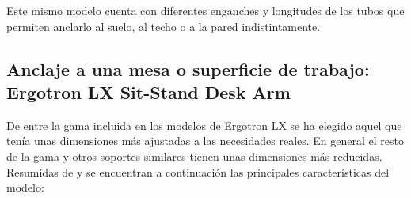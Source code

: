  Este mismo modelo cuenta con diferentes enganches y longitudes de los tubos que permiten anclarlo al suelo, al techo o a la pared indistintamente.
 \\


\subsection{Anclaje a una mesa o superficie de trabajo: Ergotron LX Sit-Stand Desk Arm}

 De entre la gama incluida en los modelos de Ergotron LX se ha elegido aquel que tenía unas dimensiones más ajustadas a las necesidades reales. En general el resto de la gama y otros soportes similares tienen unas dimensiones más reducidas. Resumidas de \cite{LXSitStand:2018} y \cite{LXSitStandWeb:2018} se encuentran a continuación las principales características del modelo:

